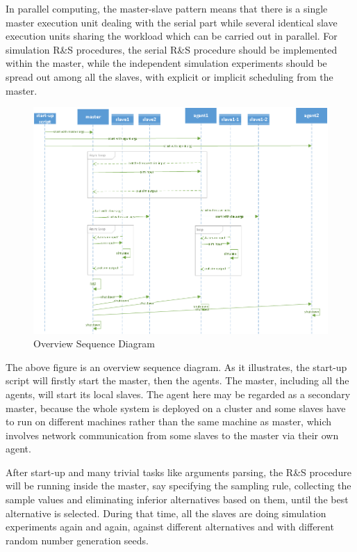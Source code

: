 In parallel computing, the master-slave pattern means that there is a single master execution unit dealing with the serial part while several identical slave execution units sharing the workload which can be carried out in parallel. For simulation R\&S procedures, the serial R\&S procedure should be implemented within the master, while the independent simulation experiments should be spread out among all the slaves, with explicit or implicit scheduling from the master.

\begin{figure}[ht]
\centering
\includegraphics[width=120mm]{overview_seq.png}
\caption{Overview Sequence Diagram}
\end{figure}

The above figure is an overview sequence diagram. As it illustrates, the start-up script will firstly start the master, then the agents. The master, including all the agents, will start its local slaves. The agent here may be regarded as a secondary master, because the whole system is deployed on a cluster and some slaves have to run on different machines rather than the same machine as master, which involves network communication from some slaves to the master via their own agent.

After start-up and many trivial tasks like arguments parsing, the R\&S procedure will be running inside the master, say specifying the sampling rule, collecting the sample values and eliminating inferior alternatives based on them, until the best alternative is selected. During that time, all the slaves are doing simulation experiments again and again, against different alternatives and with different random number generation seeds.

